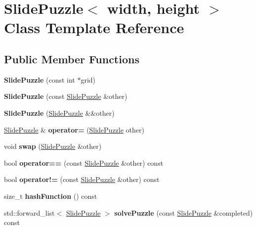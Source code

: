 \hypertarget{class_slide_puzzle}{}\section{Slide\+Puzzle$<$ width, height $>$ Class Template Reference}
\label{class_slide_puzzle}
\subsection*{Public Member Functions}
\begin{DoxyCompactItemize}
\item 
\mbox{\label{class_slide_puzzle_a7cdb0be318a2b1b7e88b8b2dd24644dd}} 
{\bfseries Slide\+Puzzle} (const int $\ast$grid)
\item 
\mbox{\label{class_slide_puzzle_a2e660c6c9f1b0aaaf01942d9453bebd6}} 
{\bfseries Slide\+Puzzle} (const \hyperlink{class_slide_puzzle}{Slide\+Puzzle} \&other)
\item 
\mbox{\label{class_slide_puzzle_ad8e5ddca5f8ff621b78a6861f9370e48}} 
{\bfseries Slide\+Puzzle} (\hyperlink{class_slide_puzzle}{Slide\+Puzzle} \&\&other)
\item 
\mbox{\label{class_slide_puzzle_aa19817f131bff9da7da3c5d017f63124}} 
\hyperlink{class_slide_puzzle}{Slide\+Puzzle} \& {\bfseries operator=} (\hyperlink{class_slide_puzzle}{Slide\+Puzzle} other)
\item 
\mbox{\label{class_slide_puzzle_a0e0b2a2e6830ed01735f6fcb9c0352c3}} 
void {\bfseries swap} (\hyperlink{class_slide_puzzle}{Slide\+Puzzle} \&other)
\item 
\mbox{\label{class_slide_puzzle_af0aca0469634bc9fe6b1676df69b6732}} 
bool {\bfseries operator==} (const \hyperlink{class_slide_puzzle}{Slide\+Puzzle} \&other) const
\item 
\mbox{\label{class_slide_puzzle_a1c3d42eb7de5baf6fd2114205b93a42d}} 
bool {\bfseries operator!=} (const \hyperlink{class_slide_puzzle}{Slide\+Puzzle} \&other) const
\item 
\mbox{\label{class_slide_puzzle_a7ebdd4a92d3ab13bc5e4b8342c13733b}} 
size\+\_\+t {\bfseries hash\+Function} () const
\item 
\mbox{\label{class_slide_puzzle_a060555f134050c6aada9413818ad3334}} 
std\+::forward\+\_\+list$<$ \hyperlink{class_slide_puzzle}{Slide\+Puzzle} $>$ {\bfseries solve\+Puzzle} (const \hyperlink{class_slide_puzzle}{Slide\+Puzzle} \&completed) const
\end{DoxyCompactItemize}
